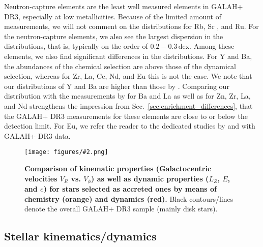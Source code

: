 \documentclass[fleqn,usenatbib]{mnras}
\newcommand{\dex}{\,\mathrm{dex}}	%
\newcommand{\codeicon}{{\faCloudDownload}}
\newcommand{\codelink}[1]{\href{https://github.com/svenbuder/Accreted-stars-in-GALAH-DR3/tree/main/figures/#1.ipynb}{\codeicon}\,\,}
\newcommand{\oscaption}[2]{\caption{#2 \codelink{#1}}}
\newcommand{\figuretextwidth}[4]{\begin{figure*} \centering \texttt{[image: figures/\#2.png]}\oscaption{#3}{#4}\label{fig:#2} \end{figure*}}
\begin{document}
Neutron-capture elements are the least well measured elements in GALAH+ DR3, especially at low metallicities. Because of the limited amount of measurements, we will not comment on the distributions for Rb, Sr \citep[see however][]{Aguado2021}, and Ru.
For the neutron-capture elements, we also see the largest dispersion in the distributions, that is, typically on the order of $0.2-0.3\dex$. Among these elements, we also find significant differences in the distributions. For Y and Ba, the abundances of the chemical selection are above those of the dynamical selection, whereas for Zr, La, Ce, Nd, and Eu this is not the case. We note that our distributions \citep[see also][]{Aguado2021} of Y and Ba are higher than those by \citet{Nissen2011}. Comparing our distribution with the measurements by \citet{Venn2004} for Ba and La as well as \citet{Fishlock2017} for Zn, Zr, La, and Nd strengthens the impression from Sec.~\ref{sec:enrichment_differences}, that the GALAH+ DR3 measurements for these elements are close to or below the detection limit. For Eu, we  refer the reader to the dedicated studies by \citet{Matsuno2021} and \citet{Aguado2021} with GALAH+ DR3 data.

\figuretextwidth{17cm}{chemdyn_dynamics}{chronochemodynamic_comparison}{
\textbf{Comparison of kinematic properties (Galactocentric velocities $V_R$ vs. $V_\phi$) as well as dynamic properties ($L_Z$, $E$, and $e$) for stars selected as accreted ones by means of chemistry (orange) and dynamics (red).} Black contours/lines denote the overall GALAH+ DR3 sample (mainly disk stars).
}

\subsection{Stellar kinematics/dynamics} \label{sec:gse_stellar_dynamics}
\end{document}
